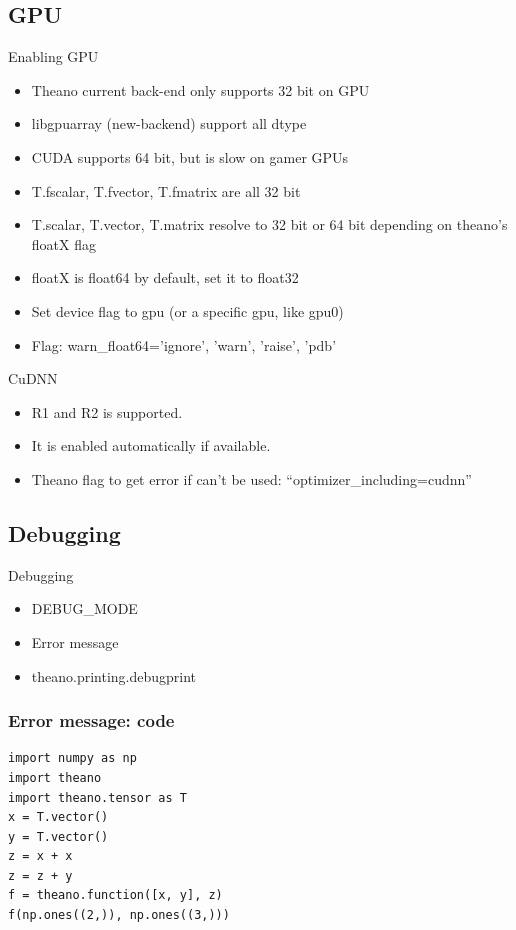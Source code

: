 \documentclass[utf8x,xcolor=pdftex,dvipsnames,table]{beamer}
\begin{document}
\subsection{GPU}
\begin{frame}{Enabling GPU}
  \begin{itemize}
  \item Theano current back-end only supports 32 bit on GPU
  \item libgpuarray (new-backend) support all dtype
  \item CUDA supports 64 bit, but is slow on gamer GPUs
  \item T.fscalar, T.fvector, T.fmatrix are all 32 bit
  \item T.scalar, T.vector, T.matrix resolve to 32 bit or 64 bit depending on theano’s floatX flag
  \item floatX is float64 by default, set it to float32
  \item Set device flag to gpu (or a specific gpu, like gpu0)
  \item Flag: warn\_float64={'ignore', 'warn', 'raise', 'pdb'}
  \end{itemize}
\end{frame}

\begin{frame}{CuDNN}
  \begin{itemize}
  \item R1 and R2 is supported.
  \item It is enabled automatically if available.
  \item Theano flag to get error if can't be used: ``optimizer\_including=cudnn''
  \end{itemize}
\end{frame}

\subsection{Debugging}
\begin{frame}{Debugging}
  \begin{itemize}
  \item DEBUG\_MODE
  \item Error message
  \item theano.printing.debugprint
  \end{itemize}
\end{frame}

\begin{frame}[fragile]
  \frametitle{Error message: code}
\begin{lstlisting}
import numpy as np
import theano
import theano.tensor as T
x = T.vector()
y = T.vector()
z = x + x
z = z + y
f = theano.function([x, y], z)
f(np.ones((2,)), np.ones((3,)))
\end{lstlisting}
\end{frame}
\end{document}
